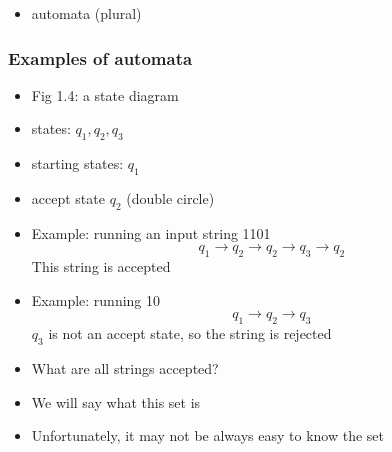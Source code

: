 \begin{frame}[allowframebreaks]
\begin{itemize}
\item [] automata (plural)

\end{itemize}\end{frame} \begin{frame}[allowframebreaks] \frametitle{Examples of automata}
  \begin{itemize}
  \item Fig 1.4: a state diagram


\item [] states: $q_1, q_2, q_3$

\item [] starting states: $q_1$

\item [] accept state $q_2$ (double circle)
\item Example: running an input string 1101
  \begin{equation*}
    q_1
\rightarrow q_2 \rightarrow
q_2 \rightarrow q_3 
\rightarrow q_2
\end{equation*}
This string is accepted
\item Example: running 10
    \begin{equation*}
    q_1
\rightarrow q_2 \rightarrow
q_3 
\end{equation*}
$q_3$ is not an accept state, so the string is rejected
\item What are all strings accepted?
\item [] We will say what this set is
\item [] Unfortunately, it may not be always easy to know the set

\end{itemize}\end{frame}


